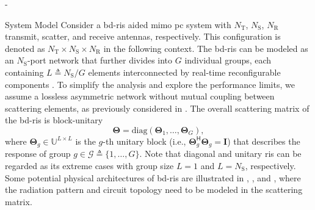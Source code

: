 \begin{section}{-}

	\begin{subsection}{System Model}
		Consider a \gls{bd}-\gls{ris} aided \gls{mimo} \gls{pc} system with $N_\mathrm{T}$, $N_\mathrm{S}$, $N_\mathrm{R}$ transmit, scatter, and receive antennas, respectively.
		This configuration is denoted as $N_\mathrm{T} \times N_\mathrm{S} \times N_\mathrm{R}$ in the following context.
		The \gls{bd}-\gls{ris} can be modeled as an $N_\mathrm{S}$-port network \cite{Ivrlac2010} that further divides into $G$ individual groups, each containing $L \triangleq N_\mathrm{S} / G$ elements interconnected by real-time reconfigurable components \cite{Shen2020a}.
		To simplify the analysis and explore the performance limits, we assume a lossless asymmetric network without mutual coupling between scattering elements, as previously considered in \cite{Li2023b,Li2023c,Bartoli2023}.
		The overall scattering matrix of the \gls{bd}-\gls{ris} is block-unitary
		\begin{equation}
			\mathbf{\Theta} = \mathrm{diag}(\mathbf{\Theta}_1,\ldots,\mathbf{\Theta}_G),
			\label{eq:bd_ris}
		\end{equation}
		where $\mathbf{\Theta}_g \in \mathbb{U}^{L \times L}$ is the $g$-th unitary block (i.e., $\mathbf{\Theta}_g^\mathsf{H} \mathbf{\Theta}_g = \mathbf{I}$) that describes the response of group $g \in \mathcal{G} \triangleq \{1, \ldots, G\}$.
		Note that diagonal and unitary \gls{ris} can be regarded as its extreme cases with group size $L=1$ and $L=N_\mathrm{S}$, respectively.
		Some potential physical architectures of \gls{bd}-\gls{ris} are illustrated in \cite[Fig. 3]{Shen2020a}, \cite[Fig. 5]{Li2023c}, and \cite[Fig. 2]{Nerini2024}, where the radiation pattern and circuit topology need to be modeled in the scattering matrix.


\end{subsection}
\end{section}
